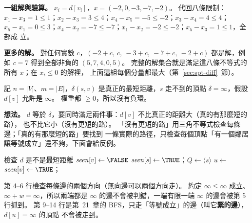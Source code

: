 \textbf{一組解與驗算。} $x_i = d[v_i]$，$x = (-2, 0, -3, -7, -2)$。 代回八條限制：
$x_1 - x_3 = 1 \le 1$；$x_2 - x_3 = 3 \le 4$；$x_4 - x_5 = -5 \le -2$；$x_3 - x_4 = 4 \le 4$；
$x_5 - x_1 = 0 \le 3$；$x_4 - x_2 = -7 \le -7$；$x_1 - x_2 = -2 \le -2$；$x_5 - x_3 = 1 \le 1$，全部成
立。

\textbf{更多的解。} 對任何實數 $c$，$(-2 + c,\ c,\ -3 + c,\ -7 + c,\ -2 + c)$ 都是解，例如 $c = 7$
得到全部非負的 $(5, 7, 4, 0, 5)$。 完整的解集合就是滿足這八條不等式的所有 $x$；在 $x_i \le 0$ 的解裡，
上面這組每個分量都最大（第~\ref{sec:spt-diff}~節）。

記 $n = |V|$、$m = |E|$，$\delta(s, v)$ 是真正的最短距離，$s$ 走不到的頂點 $\delta = \infty$，假設
$d[v]$ 允許是 $\infty$。 權重都 $\ge 0$，所以沒有負環。

\textbf{想法。} $d$ 等於 $\delta$，要同時滿足兩件事：$d[v]$ 不比真正的距離大（真的有那麼短的路），
也不比它小（沒有更短的路）。 「沒有更短的路」用三角不等式檢查每條邊；「真的有那麼短的路」要找到
一條實際的路徑，只檢查每個頂點「有一個鄰居讓等號成立」還不夠，下面會給反例。

\begin{pseudo}[label=alg:spt-px-verify]{檢查 $d$ 是不是最短距離}
        \State \Return \FALSE
    \EndIf
            \State \Return \FALSE {}
        \EndIf
    \EndFor
        \State $\mathit{seen}[v] \gets \FALSE$
    \EndFor
    \State $\mathit{seen}[s] \gets \TRUE$；$Q \gets \langle s \rangle$
        \State $u \gets$ 
                \State $\mathit{seen}[v] \gets \TRUE$；
            \EndIf
        \EndFor
    \EndWhile
            \State \Return \FALSE {}
        \EndIf
    \EndFor
    \State \Return \TRUE
\EndFunction
\end{pseudo}

第 4--6 行檢查每條邊的兩個方向（無向邊可以兩個方向走）。 約定 $\infty \le \infty$ 成立、
$\infty + w = \infty$，所以兩端都是 $\infty$ 的邊不會被判錯，一端有限一端 $\infty$ 的邊會被第 5 行抓到。
第 9--14 行是第~21~章的 BFS，只走「等號成立」的邊（叫它\textbf{緊的邊}），$d[u] = \infty$ 的頂點
不會被走到。

